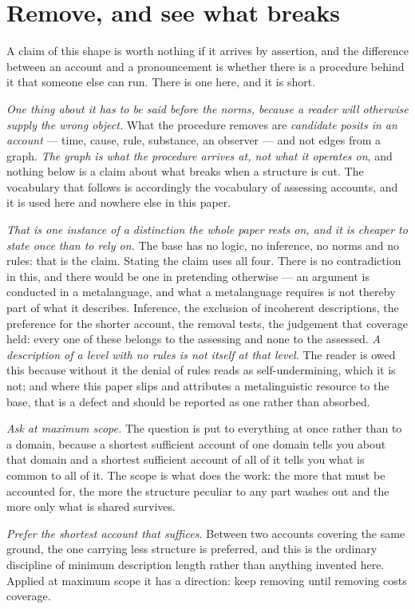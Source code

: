 \documentclass[11pt,a4paper]{article}
\begin{document}
\section{Remove, and see what breaks}\label{sec:method}
A claim of this shape is worth nothing if it arrives by assertion, and the difference between an account
and a pronouncement is whether there is a procedure behind it that someone else can run. There is one here, and it is short.

\emph{One thing about it has to be said before the norms, because a reader will otherwise supply the
wrong object.} What the procedure removes are \emph{candidate posits in an account} --- time, cause,
rule, substance, an observer --- and not edges from a graph. \emph{The graph is what the procedure
arrives at, not what it operates on}, and nothing below is a claim about what breaks when a structure
is cut. The vocabulary that follows is accordingly the vocabulary of assessing accounts, and it is used
here and nowhere else in this paper.

\emph{That is one instance of a distinction the whole paper rests on, and it is cheaper to state once
than to rely on.} The base has no logic, no inference, no norms and no rules: that is the claim.
Stating the claim uses all four. There is no contradiction in this, and there would be one in
pretending otherwise --- an argument is conducted in a metalanguage, and what a metalanguage requires
is not thereby part of what it describes. Inference, the exclusion of incoherent descriptions, the
preference for the shorter account, the removal tests, the judgement that coverage held: every one of
these belongs to the assessing and none to the assessed. \emph{A description of a level with no rules
is not itself at that level.} The reader is owed this because without it the denial of rules reads as
self-undermining, which it is not; and where this paper slips and attributes a metalinguistic resource
to the base, that is a defect and should be reported as one rather than absorbed.

\emph{Ask at maximum scope.} The question is put to everything at once rather than to a domain, because
a shortest sufficient account of one domain tells you about that domain and a shortest sufficient
account of all of it tells you what is common to all of it. The scope is what does the work: the more
that must be accounted for, the more the structure peculiar to any part washes out and the more only
what is shared survives.

\emph{Prefer the shortest account that suffices.} Between two accounts covering the same ground, the one
carrying less structure is preferred, and this is the ordinary discipline of minimum description length
rather than anything invented here. Applied at maximum scope it has a direction: keep removing until
removing costs coverage.
\end{document}
